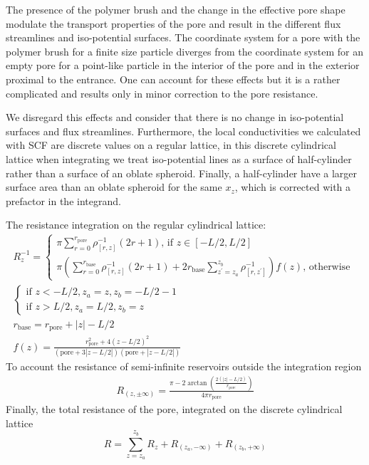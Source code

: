 \documentclass[12pt, a4paper]{article}
\begin{document}
The presence of the polymer brush and the change in the effective pore shape modulate the transport properties of the pore and result in the different flux streamlines and iso-potential surfaces.
The coordinate system for a pore with the polymer brush for a finite size particle diverges from the coordinate system for an empty pore for a point-like particle in the interior of the pore and in the exterior proximal to the entrance.
One can account for these effects but it is a rather complicated and results only in minor correction to the pore resistance.

We disregard this effects and consider that there is no change in iso-potential surfaces and flux streamlines.
Furthermore, the local conductivities we calculated with SCF are discrete values on a regular lattice, in this discrete cylindrical lattice when integrating we treat iso-potential lines as a surface of half-cylinder rather than a surface of an oblate spheroid.
Finally, a half-cylinder have a larger surface area than an oblate spheroid for the same $x_{z}$, which is corrected with a prefactor in the integrand.

The resistance integration on the regular cylindrical lattice:
\begin{gather}
    R_z^{-1} =
    \begin{cases}
         \pi \sum_{r=0}^{r_{\textrm{pore}}} \rho^{-1}_{[r,z]} (2r+1) \textrm{, if } z\in[-L/2,L/2]
         \\
         \pi \left(\sum_{r=0}^{r_{\textrm{base}}} \rho^{-1}_{[r,z]} (2r+1) + 2 r_{\textrm{base}} \sum_{z^{\prime} = z_{a}}^{z_{b}}\rho^{-1}_{[r,z^{\prime}]}\right) f(z) \textrm{, otherwise }
    \end{cases}
    \\
    \begin{cases}
        \textrm{if } z < -L/2, z_{a} = z, z_{b} = -L/2-1
        \\
        \textrm{if } z > L/2, z_{a} = L/2, z_{b} = z
    \end{cases}
    \\
    r_{\textrm{base}} = r_{\textrm{pore}} + |z| - L/2
    \\
    f(z) = \frac{r_{\textrm{pore}}^2 + 4(z-L/2)^2}{(\textrm{pore} + 3|z-L/2|)(\textrm{pore} + |z-L/2|)}
\end{gather}
To account the resistance of semi-infinite reservoirs outside the integration region
\begin{eqnarray}
    R_{(z, \pm\infty)} = \frac{\pi - 2\arctan\left(\frac{2(|z|-L/2)}{r_{\textrm{pore}}}\right)}{4\pi r_{\textrm{pore}}}
\end{eqnarray}
Finally, the total resistance of the pore, integrated on the discrete cylindrical lattice
\begin{equation}
    R = \sum_{z=z_{a}}^{z_{b}} R_z + R_{(z_{a}, -\infty)} + R_{(z_{b}, +\infty)}
\end{equation}
\end{document}
